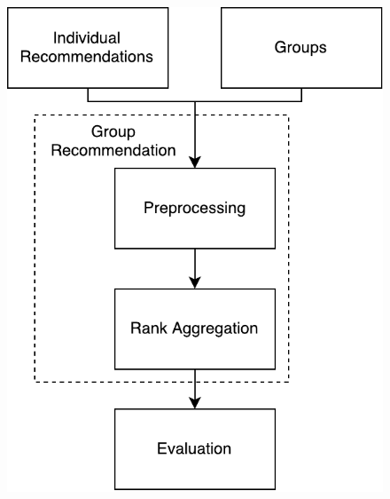 \begin{frame}
\begin{columns}
\begin{column}{0.45\textwidth}
\begin{figure}
			\includegraphics[scale=.5]{graphics/composition}
		\end{figure}
	\end{column}
\end{columns}
\end{frame}


